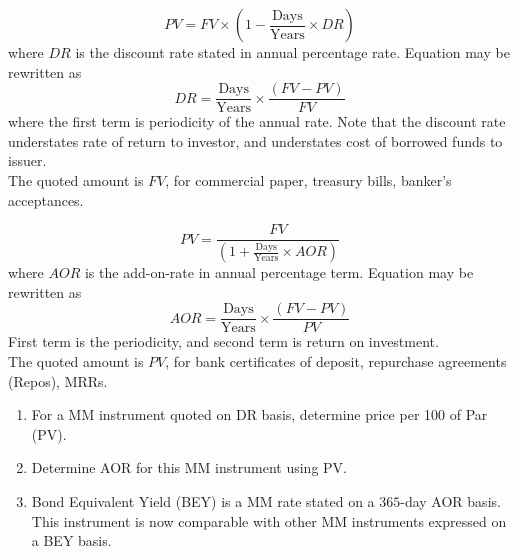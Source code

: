 \begin{method} 
\begin{equation}
PV = FV \times \left(1 - \frac{\text{Days}}{\text{Years}}\times DR \right) \nonumber
\end{equation}
where $DR$ is the discount rate stated in annual percentage rate. Equation may be rewritten as
\begin{equation}
DR = \frac{\text{Days}}{\text{Years}} \times \frac{(FV-PV)}{FV} \nonumber
\end{equation}
where the first term is periodicity of the annual rate. Note that the discount rate understates rate of return to investor, and understates cost of borrowed funds to issuer.\\
The quoted amount is $FV$, for commercial paper, treasury bills, banker's acceptances.
\end{method}

\begin{method} 
\begin{equation}
PV = \frac{FV}{\left( 1 +  \frac{\text{Days}}{\text{Years}} \times AOR \right)} \nonumber
\end{equation}
where $AOR$ is the add-on-rate in annual percentage term. Equation may be rewritten as
\begin{equation}
AOR = \frac{\text{Days}}{\text{Years}} \times \frac{(FV-PV)}{PV} \nonumber 
\end{equation}
First term is the periodicity, and second term is return on investment.\\
The quoted amount is $PV$, for bank certificates of deposit, repurchase agreements (Repos), MRRs.
\end{method}

\begin{method} 
\begin{enumerate}[label=\roman*.]
\setlength{\itemsep}{0pt}
\item For a MM instrument quoted on DR basis, determine price per 100 of Par (PV).
\item Determine AOR for this MM instrument using PV.
\item Bond Equivalent Yield (BEY) is a MM rate stated on a $365$-day AOR basis. This instrument is now comparable with other MM instruments expressed on a BEY basis.
\end{enumerate}
\end{method}
